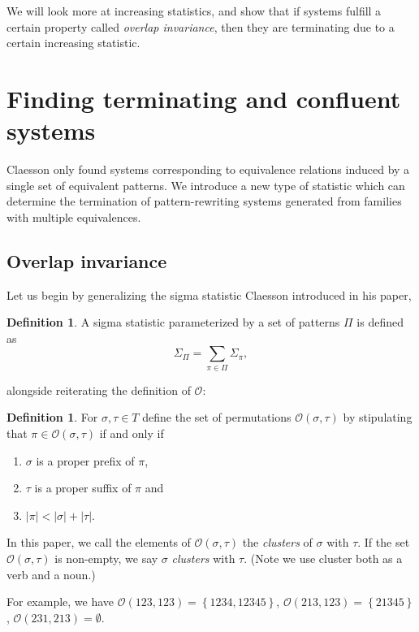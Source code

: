 \documentclass[a4paper, 11pt, english]{article}
\theoremstyle{definition}
\newtheorem{definition}[theorem]{Definition}
\newcommand{\Ocal}{\mathcal{O}}
\begin{document}
We will look more at increasing statistics, and show that if systems fulfill a certain property called
\emph{overlap invariance}, then they are terminating due to a certain increasing statistic.

\section{Finding terminating and confluent systems}
Claesson only found systems corresponding to equivalence relations induced by a
single set of equivalent patterns. We introduce a new type of statistic which can determine the
termination of pattern-rewriting systems generated from families with multiple equivalences.

\subsection{Overlap invariance}
Let us begin by generalizing the sigma statistic Claesson introduced in his paper,
\begin{definition}
    A sigma statistic parameterized by a set of patterns $\Pi$ is defined as
    \[
        \Sigma_\Pi = \sum_{\pi \in \Pi} \Sigma_{\pi},
    \]
\end{definition}
alongside reiterating the definition of $\Ocal$:
\begin{definition}
    For $\sigma, \tau \in T$ define the set of permutations $\Ocal(\sigma,
    \tau)$ by stipulating that $\pi \in \Ocal(\sigma, \tau)$ if and only if
    \begin{enumerate}
    \item $\sigma$ is a proper prefix of $\pi$,
    \item $\tau$ is a proper suffix of $\pi$ and
    \item $|\pi| < |\sigma| + |\tau|$.
    \end{enumerate}
    In this paper, we call the elements of $\Ocal(\sigma, \tau)$ the \emph{clusters} of $\sigma$ with $\tau$.
    If the set $\Ocal(\sigma, \tau)$ is non-empty, we say $\sigma$ \emph{clusters} with $\tau$.
    (Note we use cluster both as a verb and a noun.)

    For example, we have $\Ocal(123, 123) = \left\{ 1234, 12345 \right\}$, $\Ocal(213, 123) = \left\{
    21345 \right\}$, $\Ocal(231, 213) = \emptyset$.
\end{definition}
\end{document}
